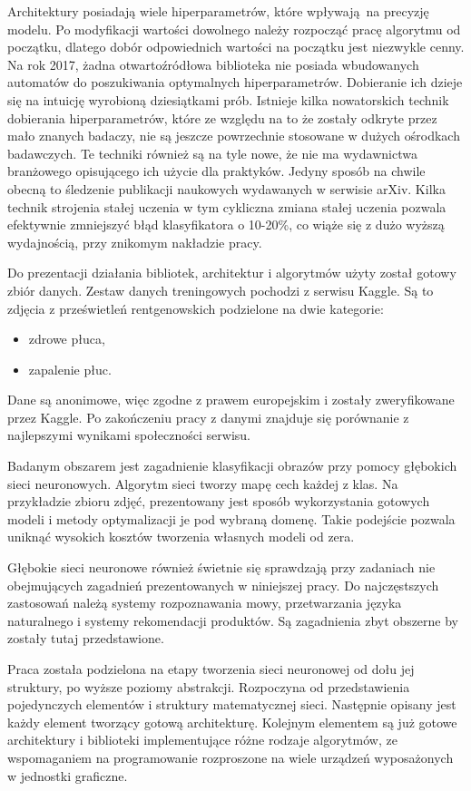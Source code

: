 \documentclass[12pt,a4paper,twoside,titlepage,openright]{book}
\begin{document}
Architektury posiadają wiele hiperparametrów, które wpływają na precyzję modelu. Po modyfikacji wartości dowolnego należy rozpocząć pracę algorytmu od początku, dlatego dobór odpowiednich wartości na początku jest niezwykle cenny. Na rok 2017, żadna otwartoźródłowa biblioteka nie posiada wbudowanych automatów do poszukiwania optymalnych hiperparametrów. Dobieranie ich dzieje się na intuicję wyrobioną dziesiątkami prób. Istnieje kilka nowatorskich technik dobierania hiperparametrów, które ze względu na to że zostały odkryte przez mało znanych badaczy, nie są jeszcze powrzechnie stosowane w dużych ośrodkach badawczych. Te techniki również są na tyle nowe, że nie ma wydawnictwa branżowego opisującego ich użycie dla praktyków. Jedyny sposób na chwile obecną to śledzenie publikacji naukowych wydawanych w serwisie arXiv. Kilka technik strojenia stałej uczenia w tym cykliczna zmiana stałej uczenia pozwala efektywnie zmniejszyć błąd klasyfikatora o 10-20\%, co wiąże się z dużo wyższą wydajnością, przy znikomym nakładzie pracy. 

Do prezentacji działania bibliotek, architektur i algorytmów użyty został gotowy zbiór danych. Zestaw danych treningowych pochodzi z serwisu Kaggle. Są to zdjęcia z prześwietleń rentgenowskich podzielone na dwie kategorie:
\begin{itemize}
\item zdrowe płuca,
\item zapalenie płuc.
\end{itemize} 
Dane są anonimowe, więc zgodne z prawem europejskim i zostały zweryfikowane przez Kaggle. Po zakończeniu pracy z danymi znajduje się porównanie z najlepszymi wynikami społeczności serwisu. 

Badanym obszarem jest zagadnienie klasyfikacji obrazów przy pomocy głębokich sieci neuronowych. Algorytm sieci tworzy mapę cech każdej z klas. Na przykładzie zbioru zdjęć, prezentowany jest sposób wykorzystania gotowych modeli i metody optymalizacji je pod wybraną domenę. Takie podejście pozwala uniknąć wysokich kosztów tworzenia własnych modeli od zera.

Głębokie sieci neuronowe również świetnie się sprawdzają przy zadaniach nie obejmujących zagadnień prezentowanych w niniejszej pracy. Do najczęstszych zastosowań należą systemy rozpoznawania mowy, przetwarzania języka naturalnego i systemy rekomendacji produktów. Są zagadnienia zbyt obszerne by zostały tutaj przedstawione.

Praca została podzielona na etapy tworzenia sieci neuronowej od dołu jej struktury, po wyższe poziomy abstrakcji. Rozpoczyna od przedstawienia pojedynczych elementów i struktury matematycznej sieci. Następnie opisany jest każdy element tworzący gotową architekturę. Kolejnym elementem są już gotowe architektury i biblioteki implementujące różne rodzaje algorytmów, ze wspomaganiem na programowanie rozproszone na wiele urządzeń wyposażonych w jednostki graficzne.
\end{document}
